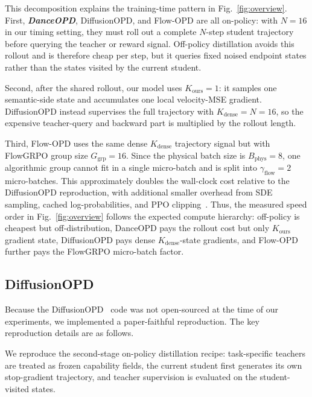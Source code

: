\documentclass{llmxive}
\providecommand{\name}{\textsl{\textbf{DanceOPD}}\xspace}
\begin{document}
This decomposition explains the training-time pattern in Fig.~\ref{fig:overview}. First, \name{}, DiffusionOPD, and Flow-OPD are all on-policy: with $N{=}16$ in our timing setting, they must roll out a complete $N$-step student trajectory before querying the teacher or reward signal. Off-policy distillation avoids this rollout and is therefore cheap per step, but it queries fixed noised endpoint states rather than the states visited by the current student. 

Second, after the shared rollout, our model uses $K_{\mathrm{ours}}{=}1$: it samples one semantic-side state and accumulates one local velocity-MSE gradient. DiffusionOPD instead supervises the full trajectory with $K_{\mathrm{dense}}{=}N{=}16$, so the expensive teacher-query and backward part is multiplied by the rollout length. 

Third, Flow-OPD uses the same dense $K_{\mathrm{dense}}$ trajectory signal but with FlowGRPO group size $G_{\mathrm{grp}}{=}16$. Since the physical batch size is $B_{\mathrm{phys}}{=}8$, one algorithmic group cannot fit in a single micro-batch and is split into $\gamma_{\mathrm{flow}}{=}2$ micro-batches. This approximately doubles the wall-clock cost relative to the DiffusionOPD reproduction, with additional smaller overhead from SDE sampling, cached log-probabilities, and PPO clipping~\cite{schulman2017proximal,liu2026flow}. Thus, the measured speed order in Fig.~\ref{fig:overview} follows the expected compute hierarchy: off-policy is cheapest but off-distribution, DanceOPD pays the rollout cost but only $K_{\mathrm{ours}}$ gradient state, DiffusionOPD pays dense $K_{\mathrm{dense}}$-state gradients, and Flow-OPD further pays the FlowGRPO micro-batch factor.


\vspace{0.2cm}


\subsection{DiffusionOPD}
\label{app:diffusionopd-reproduction}

Because the DiffusionOPD~\cite{li2026diffusionopd} code was not open-sourced at the time of our experiments, we implemented a paper-faithful reproduction. The key reproduction details are as follows.

We reproduce the second-stage on-policy distillation recipe: task-specific teachers are treated as frozen capability fields, the current student first generates its own stop-gradient trajectory, and teacher supervision is evaluated on the student-visited states. 
\end{document}

